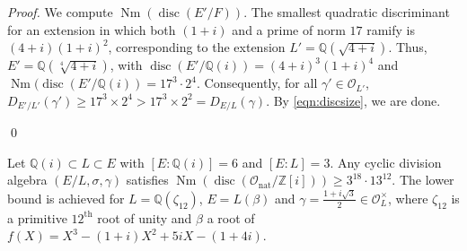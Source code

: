 \documentclass[smallextended]{svjour3}
\newcommand{\Q}{\mathbb{Q}}
\newcommand{\Z}{\mathbb{Z}}
\newcommand{\Or}{\mathcal{O}}
\DeclareMathOperator{\Nm}{Nm}
\DeclareMathOperator{\nat}{nat}
\DeclareMathOperator{\disc}{disc}
\begin{document}
\begin{proof}
We compute $\Nm(\disc(E'/F))$. The smallest quadratic discriminant for an extension in which both $(1+i)$ and a prime of norm $17$ ramify is $(4+i)(1+i)^2$, corresponding to the extension $L' = \Q(\sqrt{4+i})$. Thus, $E' = \Q(\sqrt[4]{4+i})$, with $\disc(E'/\Q(i))=(4+i)^3(1+i)^4$ and $\Nm(\disc(E'/\Q(i)) = 17^3 \cdot 2^4$. Consequently, for all $\gamma'\in \Or_{L'}$, $D_{E'/L'}(\gamma') \ge 17^3\times 2^4  > 17^3 \times 2^2 = D_{E/L}(\gamma)$. By \eqref{eqn:discsize}, we are done. 

 
 \qed
\end{proof}



\begin{theorem}
\label{thm:res4} 
Let $\Q(i) \subset L \subset E$ with $[E:\Q(i)]=6$ and
$ [E:L] = 3$. Any cyclic division algebra $\left(E/L, \sigma, \gamma\right)$ satisfies $\Nm(\disc(\Or_{\nat}/\Z[i]))\ge3^{18}\cdot 13^{12}$. The lower bound is achieved for $L = \Q(\zeta_{12})$, $E = L(\beta)$ and  $\gamma=\frac{1+i\sqrt 3}{2}\in \Or_L^{\times}$, where $\zeta_{12}$ is a primitive $12^\text{th}$ root of unity and $\beta$ a root of $f(X) = X^3-(1+i)X^2+5iX-(1+4i)$.  
\end{theorem}
\end{document}
